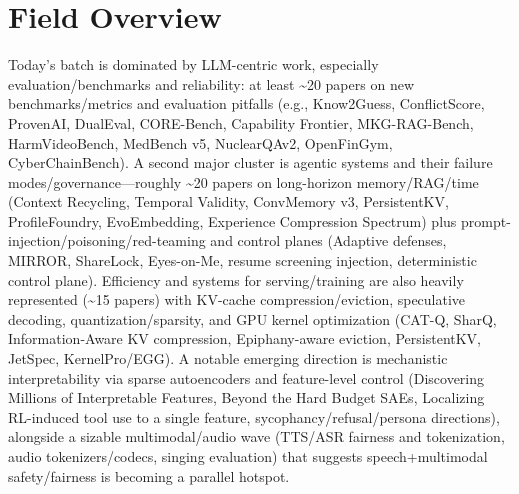 \documentclass[12pt,letterpaper]{article}
\begin{document}
\medskip



\section*{Field Overview}
{\footnotesize Today's batch is dominated by LLM-centric work, especially evaluation/benchmarks and reliability: at least \textasciitilde{}20 papers on new benchmarks/metrics and evaluation pitfalls (e.g., Know2Guess, ConflictScore, ProvenAI, DualEval, CORE-Bench, Capability Frontier, MKG-RAG-Bench, HarmVideoBench, MedBench v5, NuclearQAv2, OpenFinGym, CyberChainBench). A second major cluster is agentic systems and their failure modes/governance---roughly \textasciitilde{}20 papers on long-horizon memory/RAG/time (Context Recycling, Temporal Validity, ConvMemory v3, PersistentKV, ProfileFoundry, EvoEmbedding, Experience Compression Spectrum) plus prompt-injection/poisoning/red-teaming and control planes (Adaptive defenses, MIRROR, ShareLock, Eyes-on-Me, resume screening injection, deterministic control plane). Efficiency and systems for serving/training are also heavily represented (\textasciitilde{}15 papers) with KV-cache compression/eviction, speculative decoding, quantization/sparsity, and GPU kernel optimization (CAT-Q, SharQ, Information-Aware KV compression, Epiphany-aware eviction, PersistentKV, JetSpec, KernelPro/EGG). A notable emerging direction is mechanistic interpretability via sparse autoencoders and feature-level control (Discovering Millions of Interpretable Features, Beyond the Hard Budget SAEs, Localizing RL-induced tool use to a single feature, sycophancy/refusal/persona directions), alongside a sizable multimodal/audio wave (TTS/ASR fairness and tokenization, audio tokenizers/codecs, singing evaluation) that suggests speech+multimodal safety/fairness is becoming a parallel hotspot.}
\end{document}
